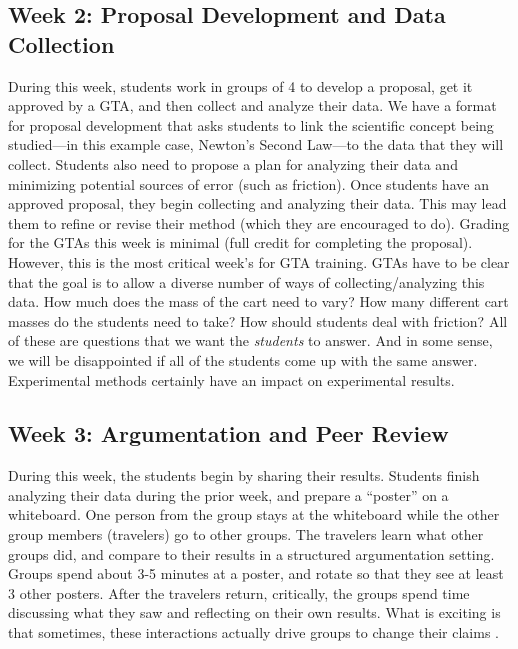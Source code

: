 \documentclass[aip, numerical, preprint]{revtex4-2}
\begin{document}
\subsection{Week 2: Proposal Development and Data Collection}
During this week, students work in groups of 4 to develop a proposal, get it approved by a GTA,
and then collect and analyze their data.  We have a format for proposal development that asks
students to link the scientific concept being studied---in this example case, Newton's Second
Law---to the data that they will collect.  Students also need to propose a plan for analyzing
their data and minimizing potential sources of error (such as friction).  Once students have an
approved proposal, they begin collecting and analyzing their data.  This may lead them to
refine or revise their method (which they are encouraged to do).  Grading for the GTAs this
week is minimal (full credit for completing the proposal).  However, this is the most critical
week's for GTA training.  GTAs have to be clear that the goal is to allow a diverse number of
ways of collecting/analyzing this data.  How much does the mass of the cart need to vary?  How
many different cart masses do the students need to take?  How should students deal with
friction? All of these are questions that we want the \textit{students} to answer.  And in some
sense, we will be disappointed if all of the students come up with the same answer.
Experimental methods certainly have an impact on experimental results.

\subsection{Week 3: Argumentation and Peer Review}
During this week, the students begin by sharing their results.  Students finish analyzing their
data during the prior week, and prepare a ``poster'' on a whiteboard.  One person from the
group stays at the whiteboard while the other group members (travelers) go to other groups.
The travelers learn what other groups did, and compare to their results in a structured
argumentation setting.  Groups spend about 3-5 minutes at a poster, and rotate so that they see
at least 3 other posters.  After the travelers return, critically, the groups spend time
discussing what they saw and reflecting on their own results.  What is exciting is that
sometimes, these interactions actually drive groups to change their claims \cite{Walker2019}.
\end{document}
